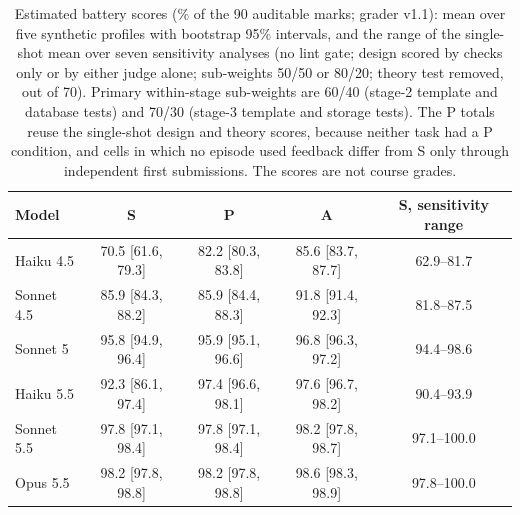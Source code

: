 \begin{table}[t]
\caption{Estimated battery scores (\% of the 90 auditable marks; grader v1.1): mean over five synthetic profiles with bootstrap 95\% intervals, and the range of the single-shot mean over seven sensitivity analyses (no lint gate; design scored by checks only or by either judge alone; sub-weights 50/50 or 80/20; theory test removed, out of 70). Primary within-stage sub-weights are 60/40 (stage-2 template and database tests) and 70/30 (stage-3 template and storage tests). The P totals reuse the single-shot design and theory scores, because neither task had a P condition, and cells in which no episode used feedback differ from S only through independent first submissions. The scores are not course grades.}
\label{tab:marks}
\footnotesize
\setlength{\tabcolsep}{3.5pt}
\begin{tabular}{lcccc}
\toprule
Model & S & P & A & S, sensitivity range\\
\midrule
Haiku 4.5 & 70.5 {\scriptsize[61.6, 79.3]} & 82.2 {\scriptsize[80.3, 83.8]} & 85.6 {\scriptsize[83.7, 87.7]} & 62.9--81.7\\
Sonnet 4.5 & 85.9 {\scriptsize[84.3, 88.2]} & 85.9 {\scriptsize[84.4, 88.3]} & 91.8 {\scriptsize[91.4, 92.3]} & 81.8--87.5\\
Sonnet 5 & 95.8 {\scriptsize[94.9, 96.4]} & 95.9 {\scriptsize[95.1, 96.6]} & 96.8 {\scriptsize[96.3, 97.2]} & 94.4--98.6\\
Haiku 5.5 & 92.3 {\scriptsize[86.1, 97.4]} & 97.4 {\scriptsize[96.6, 98.1]} & 97.6 {\scriptsize[96.7, 98.2]} & 90.4--93.9\\
Sonnet 5.5 & 97.8 {\scriptsize[97.1, 98.4]} & 97.8 {\scriptsize[97.1, 98.4]} & 98.2 {\scriptsize[97.8, 98.7]} & 97.1--100.0\\
Opus 5.5 & 98.2 {\scriptsize[97.8, 98.8]} & 98.2 {\scriptsize[97.8, 98.8]} & 98.6 {\scriptsize[98.3, 98.9]} & 97.8--100.0\\
\bottomrule
\end{tabular}
\end{table}
